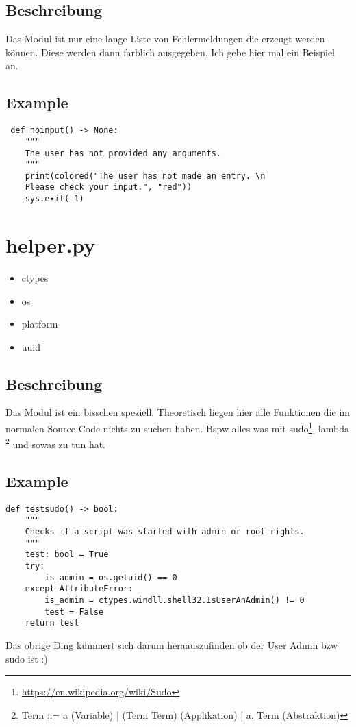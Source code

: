 \documentclass[fleqn,10pt]{olplainarticle}
\begin{document}
\subsection{Beschreibung}
Das Modul ist nur eine lange Liste von Fehlermeldungen die erzeugt werden können. Diese werden dann farblich ausgegeben. Ich gebe hier mal ein Beispiel an.
\subsection{Example}
\begin{lstlisting}
 def noinput() -> None:
    """
    The user has not provided any arguments.
    """
    print(colored("The user has not made an entry. \n
    Please check your input.", "red"))
    sys.exit(-1)
\end{lstlisting}

\section{helper.py}
\begin{itemize}
    \item ctypes
    \item os
    \item platform
    \item uuid
\end{itemize}
\subsection{Beschreibung}
Das Modul ist ein bisschen speziell. Theoretisch liegen hier alle Funktionen die im normalen Source Code nichts zu suchen haben. Bspw alles was mit sudo\footnote{\url{https://en.wikipedia.org/wiki/Sudo}}, lambda \footnote{Term ::= a (Variable) | (Term Term) (Applikation) | \lambda a. Term (Abstraktion)} und sowas zu tun hat. 
\subsection{Example}
\begin{lstlisting}
def testsudo() -> bool:
    """
    Checks if a script was started with admin or root rights.
    """
    test: bool = True
    try:
        is_admin = os.getuid() == 0
    except AttributeError:
        is_admin = ctypes.windll.shell32.IsUserAnAdmin() != 0
        test = False
    return test
\end{lstlisting}
Das obrige Ding kümmert sich darum heraauszufinden ob der User Admin bzw sudo ist :)
\end{document}

